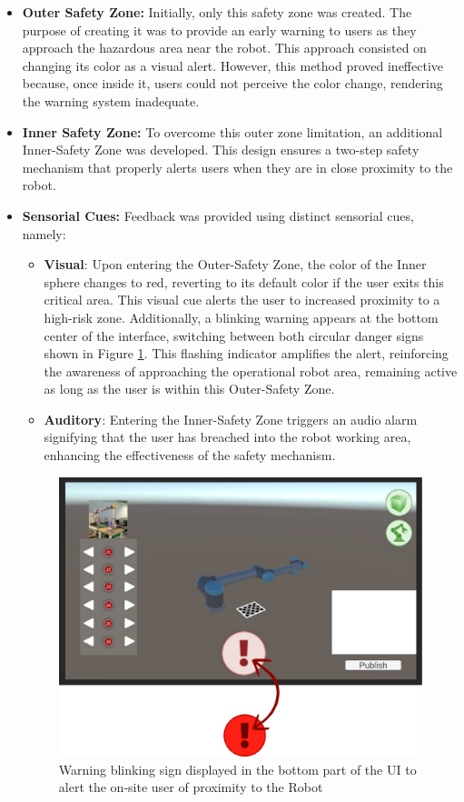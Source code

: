 \begin{itemize}
\item \textbf{Outer Safety Zone:} Initially, only this safety zone was created. The purpose of creating it was to provide an 
early warning to users as they approach the hazardous area near the robot. This approach consisted on changing its color as a visual alert. 
However, this method proved ineffective because, once inside it, users could not perceive the color change, rendering the warning system inadequate.

\item \textbf{Inner Safety Zone:} To overcome this outer zone limitation, an additional Inner-Safety Zone was developed. This design ensures a two-step safety mechanism that properly alerts users when they are in close proximity to the robot.

\item \textbf{Sensorial Cues: } Feedback was provided using distinct sensorial cues, namely:
\begin{itemize}

    \item \textbf{Visual}: Upon entering the Outer-Safety Zone, the color of the Inner sphere changes to red, reverting to its default color if the user exits this critical area. This visual cue alerts the user to increased proximity to a high-risk zone. Additionally, a blinking warning appears at the bottom center of the interface, switching between both circular danger signs shown in Figure \ref{fig:blinking-sign}. This flashing indicator amplifies the alert, reinforcing the awareness of approaching the operational robot area, remaining active as long as the user is within this Outer-Safety Zone.

    \item \textbf{Auditory}: Entering the Inner-Safety Zone triggers an audio alarm signifying that the user has breached into the robot working area, enhancing the effectiveness of the safety mechanism.
\end{itemize}

\begin{figure}[h]
    \centering
    \includegraphics[width=0.7\linewidth]{figs/sign-alert.png}
    \caption{Warning blinking sign displayed in the bottom part of the \ac{UI} to alert the on-site user of proximity to the Robot}
    \label{fig:blinking-sign}
\end{figure}


\end{itemize}
